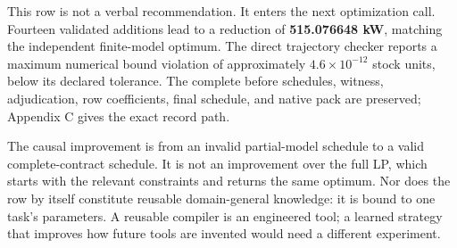 This row is not a verbal recommendation. It enters the next optimization
call. Fourteen validated additions lead to a reduction of
\textbf{515.076648 kW}, matching the independent finite-model optimum.
The direct trajectory checker reports a maximum numerical bound
violation of approximately \(4.6\times10^{-12}\) stock units, below its
declared tolerance. The complete before schedules, witness,
adjudication, row coefficients, final schedule, and native pack are
preserved; Appendix C gives the exact record path.

The causal improvement is from an invalid partial-model schedule to a
valid complete-contract schedule. It is not an improvement over the full
LP, which starts with the relevant constraints and returns the same
optimum. Nor does the row by itself constitute reusable domain-general
knowledge: it is bound to one task's parameters. A reusable compiler is
an engineered tool; a learned strategy that improves how future tools
are invented would need a different experiment.

